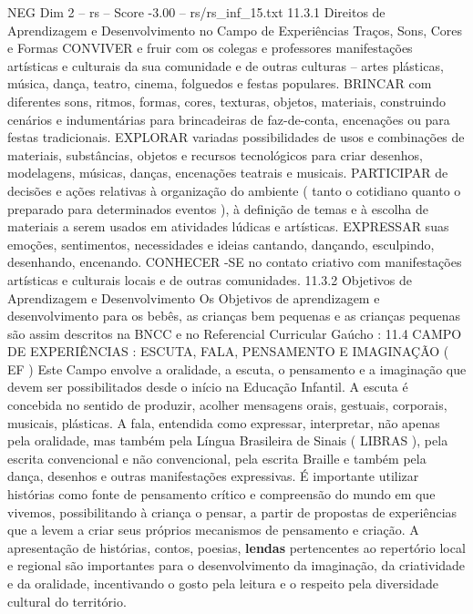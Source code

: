 \begin{textsample}{NEG Dim 2 – rs – Score -3.00 – rs/rs\_inf\_15.txt}  \label{ex:f2_neg_211}
11.3.1 Direitos de Aprendizagem e Desenvolvimento no Campo de Experiências Traços, Sons, Cores e Formas CONVIVER e fruir com os colegas e professores manifestações artísticas e culturais da sua comunidade e de outras culturas – artes plásticas, música, dança, teatro, cinema, folguedos e festas populares.
BRINCAR com diferentes sons, ritmos, formas, cores, texturas, objetos, materiais, construindo cenários e indumentárias para brincadeiras de faz-de-conta, encenações ou para festas tradicionais.
EXPLORAR variadas possibilidades de usos e combinações de materiais, substâncias, objetos e recursos tecnológicos para criar desenhos, modelagens, músicas, danças, encenações teatrais e musicais.
PARTICIPAR de decisões e ações relativas à organização do ambiente ( tanto o cotidiano quanto o preparado para determinados eventos ), à definição de temas e à escolha de materiais a serem usados em atividades lúdicas e artísticas.
EXPRESSAR suas emoções, sentimentos, necessidades e ideias cantando, dançando, esculpindo, desenhando, encenando.
CONHECER -SE no contato criativo com manifestações artísticas e culturais locais e de outras comunidades. 11.3.2 Objetivos de Aprendizagem e Desenvolvimento Os Objetivos de aprendizagem e desenvolvimento para os bebês, as crianças bem pequenas e as crianças pequenas são assim descritos na BNCC e no Referencial Curricular Gaúcho : 11.4 CAMPO DE EXPERIÊNCIAS : ESCUTA, FALA, PENSAMENTO E IMAGINAÇÃO ( EF ) Este Campo envolve a oralidade, a escuta, o pensamento e a imaginação que devem ser possibilitados desde o início na Educação Infantil.
A escuta é concebida no sentido de produzir, acolher mensagens orais, gestuais, corporais, musicais, plásticas.
A fala, entendida como expressar, interpretar, não apenas pela oralidade, mas também pela Língua Brasileira de Sinais ( LIBRAS ), pela escrita convencional e não convencional, pela escrita Braille e também pela dança, desenhos e outras manifestações expressivas.
É importante utilizar histórias como fonte de pensamento crítico e compreensão do mundo em que vivemos, possibilitando à criança o pensar, a partir de propostas de experiências que a levem a criar seus próprios mecanismos de pensamento e criação.
A apresentação de histórias, contos, poesias, \textbf{lendas} pertencentes ao repertório local e regional são importantes para o desenvolvimento da imaginação, da criatividade e da oralidade, incentivando o gosto pela leitura e o respeito pela diversidade cultural do território.

\end{textsample}
